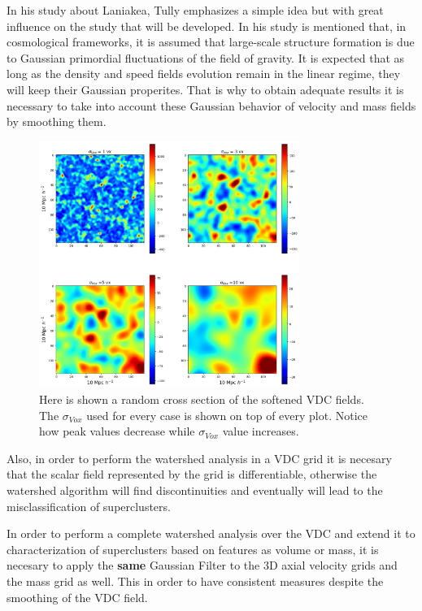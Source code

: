\documentclass[a4paper,fleqn,usenatbib]{mnras}
\begin{document}
In his study about Laniakea, Tully\cite{tully_laniakea_2014} emphasizes a simple idea but with great influence on the study that will be developed. In his study is mentioned that, in cosmological frameworks, it is assumed that large-scale structure formation is due to Gaussian primordial fluctuations of the field of gravity. It is expected that as long as the density and speed fields evolution remain in the linear regime, they will keep their Gaussian properites. That is why to obtain adequate results it is necessary to take into account these Gaussian behavior of velocity and mass fields by smoothing them.
\begin{figure}[!h]
    \centering
    \includegraphics[width=240pt]{SigmasVDC.png}
    \caption{Here is shown  a random cross section of the softened VDC fields. The $\sigma_{Vox}$ used for every case is shown on top of every plot. Notice how peak values decrease while $\sigma_{Vox}$ value increases.}
    \label{fig:SigmasVDCZcut}
\end{figure}
Also, in order to perform the watershed analysis in a VDC grid it is necesary that the scalar field represented by the grid is differentiable, otherwise the watershed algorithm will find discontinuities and eventually will lead to the misclassification of superclusters.

In order to perform a complete watershed analysis over the VDC and extend it to characterization of superclusters based on features as volume or mass,  it is necesary to apply the  \textbf{same} Gaussian Filter to the 3D axial velocity grids and the mass grid as well. This in order to have consistent measures despite the smoothing of the VDC field.
\end{document}
